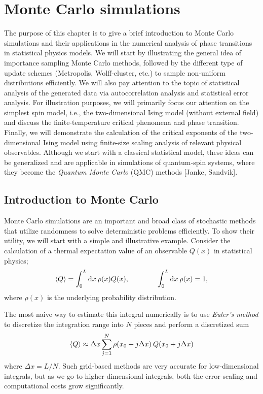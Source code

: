 \documentclass[../thesis_main.tex]{subfiles}
\begin{document}
\chapter{Monte Carlo simulations}\label{chap:1}
The purpose of this chapter is to give a brief introduction to Monte Carlo simulations and their applications in the numerical analysis of phase transitions in statistical physics models. We will start by illustrating the general idea of importance sampling Monte Carlo methods, followed by the different type of update schemes (Metropolis, Wolff-cluster, etc.) to sample non-uniform distributions efficiently. We will also pay attention to the topic of statistical analysis of the generated data via autocorrelation analysis and statistical error analysis. For illustration purposes, we will primarily focus our attention on the simplest spin model, i.e., the two-dimensional Ising model (without external field) and discuss the finite-temperature critical phenomena and phase transition. Finally, we will demonstrate the calculation of the critical exponents of the two-dimensional Ising model using finite-size scaling analysis of relevant physical observables. Although we start with a classical statistical model, these ideas can be generalized and are applicable in simulations of quantum-spin systems, where they become the \textit{Quantum Monte Carlo} (QMC) methods [Janke, Sandvik]. 

\section{Introduction to Monte Carlo}
Monte Carlo simulations are an important and broad class of stochastic methods that utilize randomness to solve deterministic problems efficiently. To show their utility, we will start with a simple and illustrative example. Consider the calculation of a thermal expectation value of an observable $Q(x)$ in statistical physics;
\begin{equation}
    \expval{Q} = \int_0^L \dd x \: \rho(x) Q(x), \qquad \qquad \int_0^L \dd x \: \rho(x) = 1,
    \label{sample_integral}
\end{equation} 
where $\rho(x)$ is the underlying probability distribution.

The most naive way to estimate this integral numerically is to use \textit{Euler's method}  to discretize the integration range into $N$ pieces and perform a discretized sum
\begin{equation}
    \expval{Q} \approx \Delta x \sum_{j=1}^N \rho(x_0 + j \Delta x) \: Q(x_0 + j\Delta x)
\end{equation} 
where $\Delta x = L/N$. Such grid-based methods are very accurate for low-dimensional integrals, but as we go to higher-dimensional integrals, both the error-scaling and computational costs grow significantly.
\end{document}
